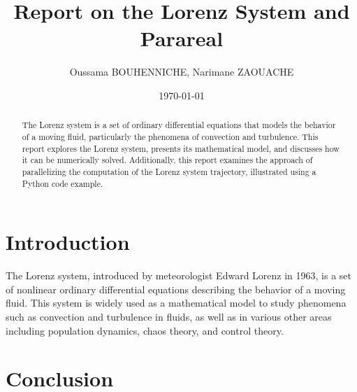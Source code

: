 \documentclass{article}
\title{Report on the Lorenz System and Parareal}
\author{Oussama  BOUHENNICHE, 
Narimane ZAOUACHE}
\date{\today}
\begin{document}
\maketitle

\begin{abstract}
The Lorenz system is a set of ordinary differential equations that models the behavior of a moving fluid, 
particularly the phenomena of convection and turbulence. This report explores the Lorenz system, presents its mathematical model, 
and discusses how it can be numerically solved. Additionally, this report examines the approach of parallelizing the computation of the Lorenz system trajectory, 
illustrated using a Python code example.
\end{abstract}

\section{Introduction}
The Lorenz system, introduced by meteorologist Edward Lorenz in 1963, 
is a set of nonlinear ordinary differential equations describing the behavior of a moving fluid. 
This system is widely used as a mathematical model to study phenomena such as convection and turbulence in fluids,
 as well as in various other areas including population dynamics, chaos theory, and control theory.

\section{}

 



\section{Conclusion}
\end{document}
